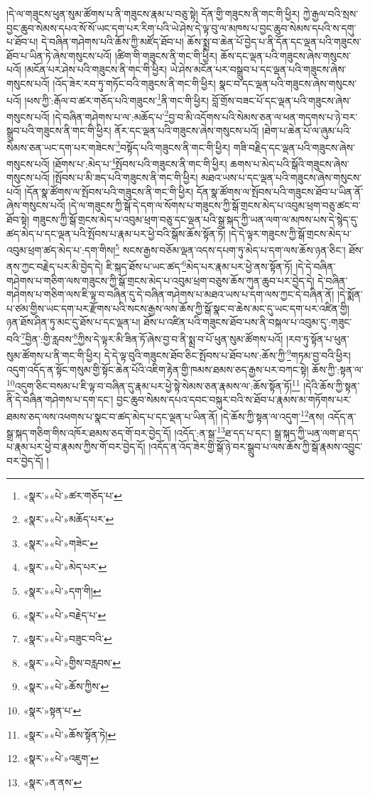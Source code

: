 །དེ་ལ་གཟུངས་ཕུན་སུམ་ཚོགས་པ་ནི་གཟུངས་རྣམ་པ་བཅུ་སྟེ། དོན་གྱི་གཟུངས་ནི་གང་གི་ཕྱིར། ཀྱེ་རྒྱལ་བའི་སྲས་བྱང་ཆུབ་སེམས་དཔའ་སོ་སོ་ཡང་དག་པར་རིག་པའི་ཡེ་ཤེས་དེ་ལྟ་བུ་ལ་མཁས་པ་བྱང་ཆུབ་སེམས་དཔའི་ས་དགུ་པ་ཐོབ་པ། དེ་བཞིན་གཤེགས་པའི་ཆོས་ཀྱི་མཛོད་ཐོབ་པ། ཆོས་སྨྲ་བ་ཆེན་པོ་བྱེད་པ་ནི་དོན་དང་ལྡན་པའི་གཟུངས་ཐོབ་པ་ཡིན་ཏེ་ཞེས་གསུངས་པའོ། །ཚིག་གི་གཟུངས་ནི་གང་གི་ཕྱིར། ཆོས་དང་ལྡན་པའི་གཟུངས་ཞེས་གསུངས་པའོ། །མངོན་པར་ཤེས་པའི་གཟུངས་ནི་གང་གི་ཕྱིར། ཡེ་ཤེས་མངོན་པར་བསྒྲུབ་པ་དང་ལྡན་པའི་གཟུངས་ཞེས་གསུངས་པའོ། །འོད་ཟེར་རབ་ཏུ་གཏོང་བའི་གཟུངས་ནི་གང་གི་ཕྱིར། སྣང་བ་དང་ལྡན་པའི་གཟུངས་ཞེས་གསུངས་པའོ། །ཕས་ཀྱི་:རྒོལ་བ་ཚར་གཅོད་པའི་གཟུངས་\footnote{«སྣར་»«པེ་»ཚར་གཅོད་པ་}ནི་གང་གི་ཕྱིར། བློ་གྲོས་བཟང་པོ་དང་ལྡན་པའི་གཟུངས་ཞེས་གསུངས་པའོ། །དེ་བཞིན་གཤེགས་པ་ལ་:མཆོད་པ་\footnote{«སྣར་»«པེ་»མཆོད་པར་}བྱ་བ་མི་འདོགས་པའི་སེམས་ཅན་ལ་ཕན་གདགས་པ་ཉེ་བར་སྒྲུབ་པའི་གཟུངས་ནི་གང་གི་ཕྱིར། ནོར་དང་ལྡན་པའི་གཟུངས་ཞེས་གསུངས་པའོ། །ཐེག་པ་ཆེན་པོ་ལ་ཞུམ་པའི་སེམས་ཅན་ཡང་དག་པར་གཟེངས་\footnote{«སྣར་»«པེ་»གཟེང་}བསྟོད་པའི་གཟུངས་ནི་གང་གི་ཕྱིར། གཟི་བརྗིད་དང་ལྡན་པའི་གཟུངས་ཞེས་གསུངས་པའོ། །ཐོགས་པ་:མེད་པ་\footnote{«སྣར་»«པེ་»མེད་པར་}སྤོབས་པའི་གཟུངས་ནི་གང་གི་ཕྱིར། ཆགས་པ་མེད་པའི་སྒོའི་གཟུངས་ཞེས་གསུངས་པའོ། །སྤོབས་པ་མི་ཟད་པའི་གཟུངས་ནི་གང་གི་ཕྱིར། མཐའ་ཡས་པ་དང་ལྡན་པའི་གཟུངས་ཞེས་གསུངས་པའོ། །དོན་སྣ་ཚོགས་ལ་སྤོབས་པའི་གཟུངས་ནི་གང་གི་ཕྱིར། དོན་སྣ་ཚོགས་ལ་སྤོབས་པའི་གཟུངས་ཐོབ་པ་ཡིན་ནོ་ཞེས་གསུངས་པའོ། །དེ་ལ་གཟུངས་ཀྱི་སྒོ་དེ་དག་ལ་སོགས་པ་གཟུངས་ཀྱི་སྒོ་གྲངས་མེད་པ་འབུམ་ཕྲག་བཅུ་ཚང་བ་ཐོབ་སྟེ། གཟུངས་ཀྱི་སྒོ་གྲངས་མེད་པ་འབུམ་ཕྲག་བཅུ་དང་ལྡན་པའི་སྒྲ་སྐད་ཀྱི་ཡན་ལག་ལ་མཁས་པས་དེ་སྙེད་དུ་ཚད་མེད་པ་དང་ལྡན་པའི་སྤོབས་པ་རྣམ་པར་ཕྱེ་བའི་སྒོས་ཆོས་སྟོན་ཏོ། །དེ་དེ་ལྟར་གཟུངས་ཀྱི་སྒོ་གྲངས་མེད་པ་འབུམ་ཕྲག་ཚད་མེད་པ་:དག་གིས།\footnote{«སྣར་»«པེ་»དག་གི།} སངས་རྒྱས་བཅོམ་ལྡན་འདས་དཔག་ཏུ་མེད་པ་དག་ལས་ཆོས་ཉན་ཅིང་། ཐོས་ནས་ཀྱང་བརྗེད་པར་མི་བྱེད་དེ། ཇི་སྐད་ཐོས་པ་ཡང་ཚད་\footnote{«སྣར་»«པེ་»བརྗེད་པ་}མེད་པར་རྣམ་པར་ཕྱེ་ནས་སྟོན་ཏོ། །དེ་དེ་བཞིན་གཤེགས་པ་གཅིག་ལས་གཟུངས་ཀྱི་སྒོ་གྲངས་མེད་པ་འབུམ་ཕྲག་བཅུས་ཆོས་ཀུན་ཆུབ་པར་བྱེད་དེ། དེ་བཞིན་གཤེགས་པ་གཅིག་ལས་ཇི་ལྟ་བ་བཞིན་དུ་དེ་བཞིན་གཤེགས་པ་མཐའ་ཡས་པ་དག་ལས་ཀྱང་དེ་བཞིན་ནོ། །དེ་སྨོན་པ་ཙམ་གྱིས་ཡང་དག་པར་རྫོགས་པའི་སངས་རྒྱས་ལས་ཆོས་ཀྱི་སྒོ་སྣང་བ་ཆེས་མང་དུ་ཡང་དག་པར་འཛིན་གྱི། ཉན་ཐོས་ཤིན་ཏུ་མང་དུ་ཐོས་པ་དང་ལྡན་པ། ཐོས་པ་འཛིན་པའི་གཟུངས་ཐོབ་པས་ནི་བསྐལ་པ་འབུམ་དུ་:གཟུང་བའི་\footnote{«སྣར་»«པེ་»བཟུང་བའི་}བྱིན་:གྱི་རླབས་\footnote{«སྣར་»«པེ་»གྱིས་བརླབས་}ཀྱིས་དེ་ལྟར་མི་ཟིན་ཏོ་ཞེས་བྱ་བ་ནི་སྨྲ་བ་པོ་ཕུན་སུམ་ཚོགས་པའོ། །རབ་ཏུ་སྟོན་པ་ཕུན་སུམ་ཚོགས་པ་ནི་གང་གི་ཕྱིར། དེ་དེ་ལྟ་བུའི་གཟུངས་ཐོབ་ཅིང་སྤོབས་པ་ཐོབ་པས་:ཆོས་ཀྱི་\footnote{«སྣར་»«པེ་»ཆོས་ཀྱིས་}གཏམ་བྱ་བའི་ཕྱིར། འདུག་འདོད་ན་སྟོང་གསུམ་གྱི་སྟོང་ཆེན་པོའི་འཇིག་རྟེན་གྱི་ཁམས་ཐམས་ཅད་རྒྱས་པར་བཀང་སྟེ། ཆོས་ཀྱི་:སྟན་ལ་\footnote{«སྣར་»སྟན་པ་}འདུག་ཅིང་བསམ་པ་ཇི་ལྟ་བ་བཞིན་དུ་རྣམ་པར་ཕྱེ་སྟེ་སེམས་ཅན་རྣམས་ལ་:ཆོས་སྟོན་ཏོ།\footnote{«སྣར་»«པེ་»ཆོས་སྟོན་ཏེ།} །དེའི་ཆོས་ཀྱི་སྟན་ནི་དེ་བཞིན་གཤེགས་པ་དག་དང་། བྱང་ཆུབ་སེམས་དཔའ་དབང་བསྐུར་བའི་ས་ཐོབ་པ་རྣམས་མ་གཏོགས་པར་ཐམས་ཅད་ལས་འཕགས་པ་སྣང་བ་ཚད་མེད་པ་དང་ལྡན་པ་ཡིན་ནོ། །དེ་ཆོས་ཀྱི་སྟན་ལ་འདུག་\footnote{«སྣར་»«པེ་»འཇུག་}ནས། འདོད་ན་སྒྲ་སྐད་གཅིག་གིས་འཁོར་ཐམས་ཅད་གོ་བར་བྱེད་དོ། །འདོད་:ན་སྒ་\footnote{«སྣར་»ན་ནས་}ཐ་དད་པ་དང་། སྒྲ་སྐད་ཀྱི་ཡན་ལག་ཐ་དད་པ་རྣམ་པར་ཕྱེ་བ་རྣམས་ཀྱིས་གོ་བར་བྱེད་དོ། །འདོད་ན་འོད་ཟེར་གྱི་སྒོ་ཉེ་བར་སྒྲུབ་པ་ལས་ཆོས་ཀྱི་སྒོ་རྣམས་འབྱུང་བར་བྱེད་དོ། །
